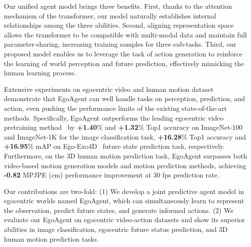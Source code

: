 Our unified agent model brings three benefits. 
First, thanks to the attention mechanism of the transformer, our model naturally establishes internal relationships among the three abilities.
Second, aligning representation space allows the transformer to be compatible with multi-modal data and maintain full parameter-sharing, increasing training samples for three sub-tasks.  
Third, our proposed model enables us to leverage the task of action generation to reinforce the learning of world perception and future prediction, effectively mimicking the human learning process.

Extensive experiments on egocentric video and human motion dataset~\cite{grauman2024ego} demonstrate that EgoAgent can well handle tasks on perception, prediction, and action, even pushing the performance limits of the existing state-of-the-art methods. Specifically, EgoAgent outperforms the leading egocentric video pretraining method~\cite{venkataramanan2023imagenet} by \textbf{+1.40}\% and \textbf{+1.32}\% Top1 accuracy on ImageNet-100 and ImageNet-1K for the image classification task, \textbf{+16.28}\% Top1 accuracy and \textbf{+16.95}\% mAP on Ego-Exo4D~\cite{grauman2024ego} future state prediction task, respectively. Furthermore, on the 3D human motion prediction task, EgoAgent surpasses both video-based motion generation models and motion prediction methods, achieving \textbf{-0.82} MPJPE (cm) performance improvement at 30 fps prediction rate. 

Our contributions are two-fold: (1) We develop a joint predictive agent model in egocentric worlds named EgoAgent, which can simultaneously learn to represent the observation, predict future states, and generate informed actions.
(2) We evaluate our EgoAgent on egocentric video-action datasets and show its superior abilities in image classification, egocentric future status prediction, and 3D human motion prediction tasks.
